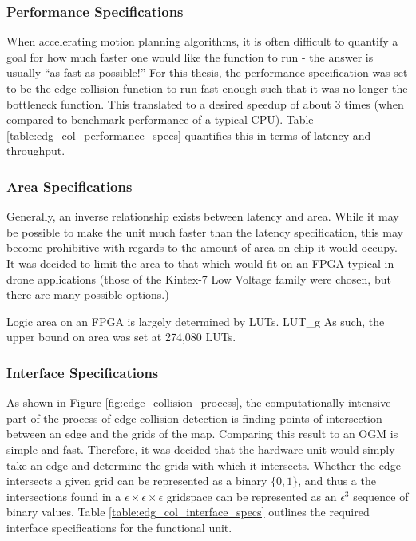    \subsubsection{Performance Specifications}
        When accelerating motion planning algorithms, it is often difficult to quantify a goal for how much faster one would like the function to run - the answer is usually ``as fast as possible!'' For this thesis, the performance specification was set to be the edge collision function to run fast enough such that it was no longer the bottleneck function. This translated to a desired speedup of about 3 times (when compared to benchmark performance of a typical CPU). Table \ref{table:edg_col_performance_specs} quantifies this in terms of latency and throughput.

        

\newpage

\subsubsection{Area Specifications}
    Generally, an inverse relationship exists between latency and area. While it may be possible to make the unit much faster than the latency specification, this may become prohibitive with regards to the amount of area on chip it would occupy. It was decided to limit the area to that which would fit on an \gls{FPGA} typical in drone applications (those of the Kintex-7 Low Voltage family were chosen, but there are many possible options.) 

    Logic area on an FPGA is largely determined by \glspl{LUT}. \glsdesc{LUT_g} As such, the upper bound on area was set at 274,080 \glspl{LUT}.

    \subsubsection{Interface Specifications}
    \label{subsection:HoneyBeeTechSpechs}
        As shown in Figure \ref{fig:edge_collision_process}, the computationally intensive part of the process of edge collision detection is finding points of intersection between an edge and the grids of the map. Comparing this result to an \gls{OGM} is simple and fast. Therefore, it was decided that the hardware unit would simply take an edge and determine the grids with which it intersects. Whether the edge intersects a given grid can be represented as a binary $\{0,1\}$, and thus a the intersections found in a $\epsilon \times \epsilon\times\epsilon$ gridspace can be represented as an $\epsilon^3$ sequence of binary values.
        Table \ref{table:edg_col_interface_specs} outlines the required interface specifications for the functional unit.
        